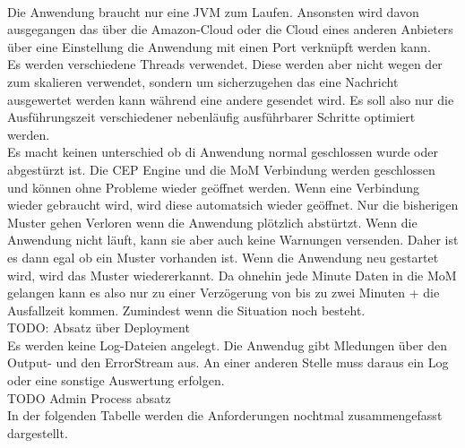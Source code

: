 \\
Die Anwendung braucht nur eine JVM zum Laufen. Ansonsten wird davon ausgegangen das über die Amazon-Cloud oder die Cloud eines anderen Anbieters über eine Einstellung die Anwendung mit einen Port verknüpft werden kann. 
\\
Es werden verschiedene Threads verwendet. Diese werden aber nicht wegen der zum skalieren verwendet, sondern um sicherzugehen das eine Nachricht ausgewertet werden kann während eine andere gesendet wird. Es soll also nur die Ausführungszeit verschiedener nebenläufig ausführbarer Schritte optimiert werden. 
\\
Es macht keinen unterschied ob di Anwendung normal geschlossen wurde oder abgestürzt ist. Die CEP Engine und die MoM Verbindung werden geschlossen und können ohne Probleme wieder geöffnet werden. Wenn eine Verbindung wieder gebraucht wird, wird diese automatsich wieder geöffnet. Nur die bisherigen Muster gehen Verloren wenn die Anwendung plötzlich abstürtzt. Wenn die Anwendung nicht läuft, kann sie aber auch keine Warnungen versenden. Daher ist es dann egal ob ein Muster vorhanden ist. Wenn die Anwendung neu gestartet wird, wird das Muster wiedererkannt. Da ohnehin jede Minute Daten in die MoM gelangen kann es also nur zu einer Verzögerung von bis zu zwei Minuten + die Ausfallzeit kommen. Zumindest wenn die Situation noch besteht.  
\\
TODO: Absatz über Deployment
\\
Es werden keine Log-Dateien angelegt. Die Anwendug gibt Mledungen über den Output- und den ErrorStream aus. An einer anderen Stelle muss daraus ein Log oder eine sonstige Auswertung erfolgen. 
\\
TODO Admin Process absatz
\\
In der folgenden Tabelle werden die Anforderungen nochtmal zusammengefasst dargestellt. 
